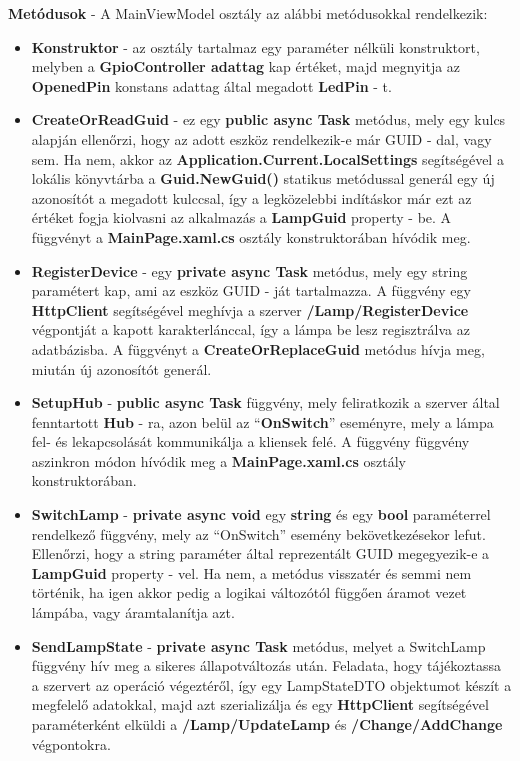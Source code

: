 \documentclass[a4paper,12pt]{report}
\begin{document}
    \textbf{Metódusok} - A MainViewModel osztály az alábbi metódusokkal rendelkezik:

    \begin{itemize}
        \item \textbf{Konstruktor} - az osztály tartalmaz egy paraméter nélküli konstruktort, melyben a \textbf{GpioController adattag} kap értéket,
        majd megnyitja az \textbf{OpenedPin} konstans adattag által megadott \textbf{LedPin} - t.
        \item \textbf{CreateOrReadGuid} - ez egy \textbf{public async Task} metódus, mely egy kulcs alapján ellenőrzi, hogy az adott eszköz
        rendelkezik-e már GUID - dal, vagy sem. Ha nem, akkor az \textbf{Application.Current.LocalSettings} segítségével a lokális könyvtárba
        a \textbf{Guid.NewGuid()} statikus metódussal generál egy új azonosítót a megadott kulccsal, így a legközelebbi indításkor már ezt az értéket
        fogja kiolvasni az alkalmazás a \textbf{LampGuid} property - be. A függvényt a \textbf{MainPage.xaml.cs} osztály konstruktorában hívódik meg.
        \item \textbf{RegisterDevice} - egy \textbf{private async Task} metódus, mely egy string paramétert kap, ami az eszköz GUID - ját tartalmazza.
        A függvény egy \textbf{HttpClient} segítségével meghívja a szerver \textbf{/Lamp/RegisterDevice} végpontját a kapott karakterlánccal, így
        a lámpa be lesz regisztrálva az adatbázisba. A függvényt a \textbf{CreateOrReplaceGuid} metódus hívja meg, miután új azonosítót generál.
        \item \textbf{SetupHub} - \textbf{public async Task} függvény, mely feliratkozik a szerver által fenntartott \textbf{Hub} - ra, azon belül
        az ``\textbf{OnSwitch}'' eseményre, mely a lámpa fel- és lekapcsolását kommunikálja a kliensek felé. A függvény függvény aszinkron módon hívódik
        meg a \textbf{MainPage.xaml.cs} osztály konstruktorában.
        \item \textbf{SwitchLamp} - \textbf{private async void} egy \textbf{string} és egy \textbf{bool} paraméterrel rendelkező függvény, mely az ``OnSwitch''
        esemény bekövetkezésekor lefut. Ellenőrzi, hogy a string paraméter által reprezentált GUID megegyezik-e a \textbf{LampGuid} property - vel. Ha nem,
        a metódus visszatér és semmi nem történik, ha igen akkor pedig a logikai változótól függően áramot vezet lámpába, vagy áramtalanítja azt.
        \item \textbf{SendLampState} - \textbf{private async Task} metódus, melyet a SwitchLamp függvény hív meg a sikeres állapotváltozás után.
        Feladata, hogy tájékoztassa a szervert az operáció végeztéről, így egy LampStateDTO objektumot készít a megfelelő adatokkal, majd azt szerializálja
        és egy \textbf{HttpClient} segítségével paraméterként elküldi a \textbf{/Lamp/UpdateLamp} és \textbf{/Change/AddChange} végpontokra.
    \end{itemize}
\end{document}
